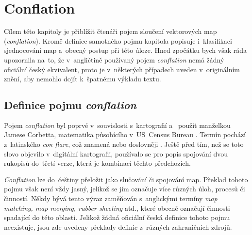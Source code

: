 \chapter{Conflation}
\label{2-conflation}

Cílem této kapitoly je přiblížit čtenáři pojem sloučení vektorových map
(\textit{conflation}). Kro\-mě definice samotného pojmu kapitola popisuje 
i~klasifikaci sjednocování map a~obecný postup při této úloze. Hned zpočátku
bych však ráda upozornila na~to, že v~angličtině používaný pojem 
\textit{conflation} nemá žádný oficiální český ekvivalent, proto je v~některých
případech uveden v~originálním znění, aby nemohlo dojít k~špatnému výkladu 
textu.

\section{Definice pojmu \textit{conflation}}
\label{definice}

Pojem \textit{conflation} byl poprvé v~souvislosti s~kartografií a~
použit manželkou Jamese Corbetta, matematika působícího v~US~Census Bureau \cite{saalfeldvideo}.
Termín pochází z~latinského \textit{con flare}, což znamená 
nebo doslovněji . Ještě před tím, než se toto slovo 
objevilo v~digitální kartografii, používalo se pro popis spojování dvou 
rukopisů do~třetí verze, která je kombinací těchto předchozích.

\textit{Conflation} lze do~češtiny přeložit jako slučování či spojování map. 
Překlad tohoto pojmu však není vždy jasný, jelikož se jím označuje více různých 
úloh, procesů či činností. Někdy bývá tento výraz zaměňován s~anglickými 
termíny \textit{map matching, map merging, rubber sheeting} atd., které obecně
označují činnosti spadající do této oblasti. Jelikož žádná oficiální česká
definice tohoto pojmu neexistuje, jsou zde uvedeny překlady definic z~různých 
zahraničních zdrojů. 

